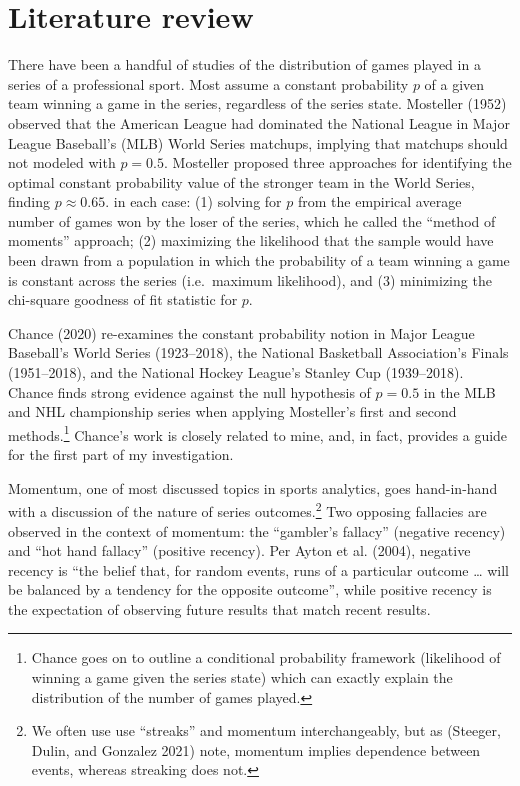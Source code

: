 \documentclass{article}
\begin{document}
\hypertarget{literature-review}{%
\section{Literature review}\label{literature-review}}

There have been a handful of studies of the distribution of games played
in a series of a professional sport. Most assume a constant probability
\(p\) of a given team winning a game in the series, regardless of the
series state. Mosteller (1952) observed that the American League had
dominated the National League in Major League Baseball's (MLB) World
Series matchups, implying that matchups should not modeled with
\(p = 0.5\). Mosteller proposed three approaches for identifying the
optimal constant probability value of the stronger team in the World
Series, finding \(p \approx 0.65\). in each case: (1) solving for \(p\)
from the empirical average number of games won by the loser of the
series, which he called the ``method of moments'' approach; (2)
maximizing the likelihood that the sample would have been drawn from a
population in which the probability of a team winning a game is constant
across the series (i.e.~maximum likelihood), and (3) minimizing the
chi-square goodness of fit statistic for \(p\).

Chance (2020) re-examines the constant probability notion in Major
League Baseball's World Series (1923--2018), the National Basketball
Association's Finals (1951--2018), and the National Hockey League's
Stanley Cup (1939--2018). Chance finds strong evidence against the null
hypothesis of \(p = 0.5\) in the MLB and NHL championship series when
applying Mosteller's first and second methods.\footnote{Chance goes on
  to outline a conditional probability framework (likelihood of winning
  a game given the series state) which can exactly explain the
  distribution of the number of games played.} Chance's work is closely
related to mine, and, in fact, provides a guide for the first part of my
investigation.

Momentum, one of most discussed topics in sports analytics, goes
hand-in-hand with a discussion of the nature of series
outcomes.\footnote{We often use use ``streaks'' and momentum
  interchangeably, but as (Steeger, Dulin, and Gonzalez 2021) note,
  momentum implies dependence between events, whereas streaking does
  not.} Two opposing fallacies are observed in the context of momentum:
the ``gambler's fallacy'' (negative recency) and ``hot hand fallacy''
(positive recency). Per Ayton et al. (2004), negative recency is ``the
belief that, for random events, runs of a particular outcome \ldots{}
will be balanced by a tendency for the opposite outcome'', while
positive recency is the expectation of observing future results that
match recent results.
\end{document}
